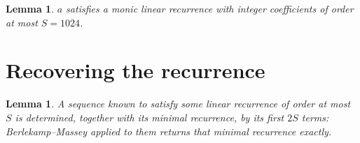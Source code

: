 \documentclass[11pt,a4paper]{article}
\theoremstyle{plain}
\newtheorem{lemma}[theorem]{Lemma}
\theoremstyle{definition}
\begin{document}
\begin{lemma}\label{lem:cf}
$a$ satisfies a monic linear recurrence with integer coefficients of order at most $S=1024$.
\end{lemma}

\section{Recovering the recurrence}

\begin{lemma}\label{lem:bm}
A sequence known to satisfy some linear recurrence of order at most $S$ is determined, together
with its minimal recurrence, by its first $2S$ terms: Berlekamp--Massey applied to them returns
that minimal recurrence exactly.
\end{lemma}
\end{document}
